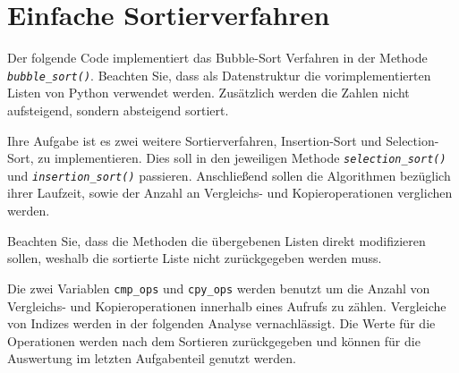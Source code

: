 \documentclass[11pt]{article}
\begin{document}
    \hypertarget{einfache-sortierverfahren}{%
\section{Einfache Sortierverfahren}\label{einfache-sortierverfahren}}

Der folgende Code implementiert das Bubble-Sort Verfahren in der Methode
\emph{\texttt{bubble\_sort()}}. Beachten Sie, dass als Datenstruktur die
vorimplementierten Listen von Python verwendet werden. Zusätzlich werden
die Zahlen nicht aufsteigend, sondern absteigend sortiert.

Ihre Aufgabe ist es zwei weitere Sortierverfahren, Insertion-Sort und
Selection-Sort, zu implementieren. Dies soll in den jeweiligen Methode
\emph{\texttt{selection\_sort()}} und \emph{\texttt{insertion\_sort()}}
passieren. Anschließend sollen die Algorithmen bezüglich ihrer Laufzeit,
sowie der Anzahl an Vergleichs- und Kopieroperationen verglichen werden.

Beachten Sie, dass die Methoden die übergebenen Listen direkt
modifizieren sollen, weshalb die sortierte Liste nicht zurückgegeben
werden muss.

Die zwei Variablen \texttt{cmp\_ops} und \texttt{cpy\_ops} werden
benutzt um die Anzahl von Vergleichs- und Kopieroperationen innerhalb
eines Aufrufs zu zählen. Vergleiche von Indizes werden in der folgenden
Analyse vernachlässigt. Die Werte für die Operationen werden nach dem
Sortieren zurückgegeben und können für die Auswertung im letzten
Aufgabenteil genutzt werden.
\end{document}
